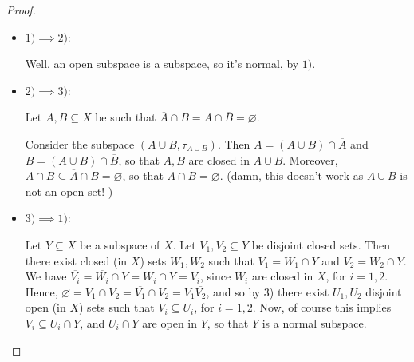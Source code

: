 \documentclass[12pt]{extarticle}
\newcommand{\<}{\langle}
\renewcommand{\>}{\rangle}
\renewcommand{\emptyset}{\varnothing}
\theoremstyle{definition}
\begin{document}
\begin{proof}
  \begin{itemize}
  \item $1) \implies 2)$:

    Well, an open subspace is a subspace, so it's normal, by $1)$.
  \item $2) \implies 3)$:

    Let $A,B \subseteq X$ be such that $\overline{A} \cap B = A \cap \overline{B} = \emptyset$.

    Consider the subspace $(A \cup B, \tau_{A \cup B})$. Then $A = (A \cup B) \cap \overline{A}$ and $B = (A \cup B) \cap \overline{B}$, so that $A, B$ are closed in $A \cup B$.
    Moreover, $A \cap B \subseteq \overline{A} \cap B = \emptyset$, so that $A \cap B = \emptyset$. (damn, this doesn't work as $A \cup B$ is not an open set! )


  \item $3) \implies 1)$:
    
    Let $Y \subseteq X$ be a subspace of $X$. Let $V_1, V_2 \subseteq Y$ be disjoint closed sets. Then there exist closed (in $X$) sets $W_1, W_2$ such that
    $V_1 = W_1 \cap Y$ and $V_2 = W_2 \cap Y$. We have $\overline{V_i} = \overline{W_i} \cap Y = W_i \cap Y = V_i $, since $W_i$ are closed in $X$, for $i=1,2$.
    Hence, $\emptyset = V_1 \cap V_2 = \overline{V_1} \cap V_2 = V_1 \overline{V_2}$, and so by 3) there exist $U_1, U_2$ disjoint open (in $X$) sets such that
    $V_i \subseteq U_i$, for $i=1,2$. Now, of course this implies $V_i \subseteq U_i \cap Y$, and $U_i \cap Y$ are open in $Y$, so that $Y$ is a normal subspace. 
  \end{itemize}
\end{proof}
\end{document}
